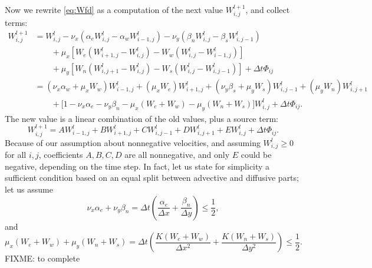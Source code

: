 \documentclass[12pt,final]{amsart}%
\newcommand{\Wlij}{W^l_{i,j}}
\begin{document}
Now we rewrite \eqref{eq:Wfd} as a computation of the next value $W_{i,j}^{l+1}$, and collect terms:
\begin{align*}
 W_{i,j}^{l+1} &= \Wlij - \nu_x \left(\alpha_e \Wlij - \alpha_w W_{i-1,j}^l\right) - \nu_y \left(\beta_n \Wlij - \beta_s W_{i,j-1}^l\right)  \\
      &\qquad + \mu_x \left[W_e \left(W_{i+1,j}^l - \Wlij\right) - W_w \left(\Wlij - W_{i-1,j}^l\right)\right]  \\
      &\qquad + \mu_y \left[W_n \left(W_{i,j+1}^l - \Wlij\right) - W_s \left(\Wlij - W_{i,j-1}^l\right)\right] + \Delta t \Phi_{ij} \\
      &= (\nu_x \alpha_w + \mu_x W_w) W_{i-1,j}^l + (\mu_x W_e) W_{i+1,j}^l + (\nu_y \beta_s + \mu_y W_s) W_{i,j-1}^l + (\mu_y W_n) W_{i,j+1}^l \\
      &\qquad + \Big[1 - \nu_x \alpha_e - \nu_y \beta_n - \mu_x (W_e + W_w) - \mu_y (W_n + W_s)\Big] \Wlij + \Delta t \Phi_{ij}.
\end{align*}
The new value is a linear combination of the old values, plus a source term:
   $$W_{i,j}^{l+1} = A W_{i-1,j}^l + B W_{i+1,j}^l + C W_{i,j-1}^l + D W_{i,j+1}^l + E \Wlij + \Delta t \Phi_{ij}.$$
Because of our assumption about nonnegative velocities, and assuming $\Wlij \ge 0$ for all $i,j$, coefficients $A,B,C,D$ are all nonnegative, and only $E$ could be negative, depending on the time step.  In fact, let us state for simplicity a sufficient condition based on an equal split between advective and diffusive parts; let us assume
	$$\nu_x \alpha_e + \nu_y \beta_n = \Delta t \left(\frac{\alpha_e}{\Delta x} + \frac{\beta_n}{\Delta y}\right) \le \frac{1}{2},$$
and
    $$\mu_x (W_e + W_w) + \mu_y (W_n + W_s) = \Delta t \left(\frac{K(W_e + W_w)}{\Delta x^2} + \frac{K(W_n + W_s)}{\Delta y^2}\right) \le \frac{1}{2}.$$
FIXME: to complete
\end{document}
